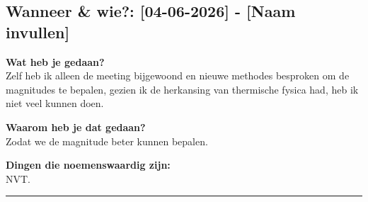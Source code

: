
\subsection*{Wanneer \& wie?: [04-06-2026] - [Naam invullen]}

\textbf{Wat heb je gedaan?}\\
Zelf heb ik alleen de meeting bijgewoond en nieuwe methodes besproken om de magnitudes te bepalen, gezien ik de herkansing van thermische fysica had, heb ik niet veel kunnen doen.
\vspace{0.3cm} 

\noindent \textbf{Waarom heb je dat gedaan?}\\
Zodat we de magnitude beter kunnen bepalen.


\noindent \textbf{Dingen die noemenswaardig zijn:}\\
NVT.


\vspace{0.5cm}
\hrule 
\vspace{0.5cm}
